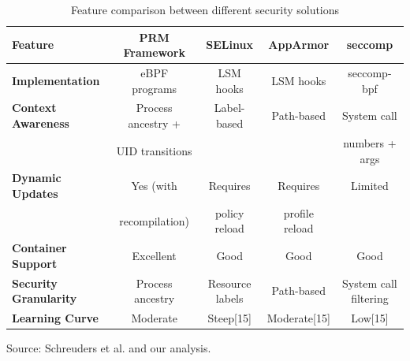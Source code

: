 \begin{table}[htbp]
\caption{Feature comparison between different security solutions}
\label{tab:features}
\centering
\begin{tabular}{|l|c|c|c|c|}
\hline
\textbf{Feature} & \textbf{PRM Framework} & \textbf{SELinux} & \textbf{AppArmor} & \textbf{seccomp} \\
\hline
\textbf{Implementation} & eBPF programs & LSM hooks & LSM hooks & seccomp-bpf \\
\hline
\textbf{Context Awareness} & Process ancestry + & Label-based & Path-based & System call \\
 & UID transitions &  &  & numbers + args \\
\hline
\textbf{Dynamic Updates} & Yes (with & Requires & Requires & Limited \\
 & recompilation) & policy reload & profile reload &  \\
\hline
\textbf{Container Support} & Excellent & Good & Good & Good \\
\hline
\textbf{Security Granularity} & Process ancestry & Resource labels & Path-based & System call filtering \\
\hline
\textbf{Learning Curve} & Moderate & Steep[15] & Moderate[15] & Low[15] \\
\hline
\end{tabular}
\begin{tablenotes}
\small
\item Source: Schreuders et al. \cite{schreuders2011empowering} and our analysis.
\end{tablenotes}
\end{table}